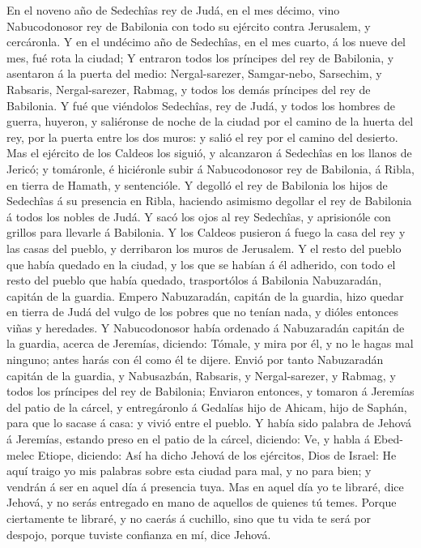  En el noveno año de Sedechîas rey de Judá, en el mes
décimo, vino Nabucodonosor rey de Babilonia con todo su ejército contra
Jerusalem, y cercáronla.  Y en el undécimo año de Sedechîas,
en el mes cuarto, á los nueve del mes, fué rota la ciudad; 
Y entraron todos los príncipes del rey de Babilonia, y asentaron á la
puerta del medio: Nergal-sarezer, Samgar-nebo, Sarsechim, y Rabsaris,
Nergal-sarezer, Rabmag, y todos los demás príncipes del rey de
Babilonia.  Y fué que viéndolos Sedechîas, rey de Judá, y
todos los hombres de guerra, huyeron, y saliéronse de noche de la ciudad
por el camino de la huerta del rey, por la puerta entre los dos muros: y
salió el rey por el camino del desierto.  Mas el ejército de
los Caldeos los siguió, y alcanzaron á Sedechîas en los llanos de
Jericó; y tomáronle, é hiciéronle subir á Nabucodonosor rey de
Babilonia, á Ribla, en tierra de Hamath, y sentencióle.  Y
degolló el rey de Babilonia los hijos de Sedechîas á su presencia en
Ribla, haciendo asimismo degollar el rey de Babilonia á todos los nobles
de Judá.  Y sacó los ojos al rey Sedechîas, y aprisionóle
con grillos para llevarle á Babilonia.  Y los Caldeos
pusieron á fuego la casa del rey y las casas del pueblo, y derribaron
los muros de Jerusalem.  Y el resto del pueblo que había
quedado en la ciudad, y los que se habían á él adherido, con todo el
resto del pueblo que había quedado, trasportólos á Babilonia
Nabuzaradán, capitán de la guardia.  Empero Nabuzaradán,
capitán de la guardia, hizo quedar en tierra de Judá del vulgo de los
pobres que no tenían nada, y dióles entonces viñas y heredades.
 Y Nabucodonosor había ordenado á Nabuzaradán capitán de la
guardia, acerca de Jeremías, diciendo:  Tómale, y mira por
él, y no le hagas mal ninguno; antes harás con él como él te dijere.
 Envió por tanto Nabuzaradán capitán de la guardia, y
Nabusazbán, Rabsaris, y Nergal-sarezer, y Rabmag, y todos los príncipes
del rey de Babilonia;  Enviaron entonces, y tomaron á
Jeremías del patio de la cárcel, y entregáronlo á Gedalías hijo de
Ahicam, hijo de Saphán, para que lo sacase á casa: y vivió entre el
pueblo.  Y había sido palabra de Jehová á Jeremías, estando
preso en el patio de la cárcel, diciendo:  Ve, y habla á
Ebed-melec Etiope, diciendo: Así ha dicho Jehová de los ejércitos, Dios
de Israel: He aquí traigo yo mis palabras sobre esta ciudad para mal, y
no para bien; y vendrán á ser en aquel día á presencia tuya.
 Mas en aquel día yo te libraré, dice Jehová, y no serás
entregado en mano de aquellos de quienes tú temes.  Porque
ciertamente te libraré, y no caerás á cuchillo, sino que tu vida te será
por despojo, porque tuviste confianza en mí, dice Jehová.

